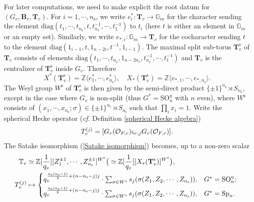 \documentclass[12pt,oneside,reqno]{amsart}
\theoremstyle{plain}
\begin{document}
	For later computations, we need to make explicit the root datum for	$(G_v,\mathbf{B}_v,\mathbf{T}_v)$. For $i=1,\cdots,n_\mathrm{s}$,
	we write $e^\ast_i\colon\mathbf{T}_v\rightarrow\mathbb{G}_m$ for the character sending the element $\mathrm{diag}(t_1,\cdots,t_{n_\mathrm{s}},t,
	t_{n_\mathrm{s}}^{-1},\cdots,t_1^{-1})$ to $t_i$ (here $t$ is either an element in $\mathbb{G}_m$ or an empty set). Similarly, we write $e_{\ast,i}\colon
	\mathbb{G}_m\rightarrow\mathbf{T}_v$ for the cocharacter sending
	$t$ to the element $\mathrm{diag}(1_{i-1},t,1_{n-2i},t^{-1},1_{i-1})$.
	The maximal split sub-torus $\mathbf{T}_v^\mathrm{s}$ of $\mathbf{T}_v$
	consists of elements $\mathrm{diag}(t_1,\cdots,t_{n_\mathrm{s}},1_{n-2n_\mathrm{s}},
	t_{n_\mathrm{s}}^{-1},\cdots,t_1^{-1})$ and $\mathbf{T}_v$ is the centralizer of $\mathbf{T}_v^\mathrm{s}$ inside $G_v$. Therefore
	\[
	X^\ast
	(\mathbf{T}_v^\mathrm{s})
	=
	\mathbb{Z}\langle e_1^\ast,\cdots,e_{n_\mathrm{s}}^\ast\rangle,
	\quad
	X_\ast(\mathbf{T}_v^\mathrm{s})
	=
	\mathbb{Z}
	\langle
	e_{\ast,1},\cdots,e_{\ast,n_\mathrm{s}}\rangle.
	\]
	The Weyl group $W^\mathrm{s}$ of $\mathbf{T}_v^\mathrm{s}$ is then given by the semi-direct product $\{\pm1\}^{n_\mathrm{s}}\rtimes S_{n_\mathrm{s}}$, except in the case where $G_v$ is non-split (thus $G^\ast=\mathrm{SO}_n^\eta$ with $n$ even), where $W^\mathrm{s}$ consists of $(x_1,\cdots,x_{n_\mathrm{s}};\sigma)\in\{\pm1\}^{n_\mathrm{s}}\rtimes S_{n_\mathrm{s}}$ such that $\prod_ix_i=1$. Write the spherical Hecke operator (\emph{cf.} Definition \ref{spherical Hecke algebra})
	\begin{equation}\label{spherical Hecke operators}
		T_v^{(j)}
		=
		[
		G_v(\mathcal{O}_{F,v})
		\varsigma_{v,j}
		G_v(\mathcal{O}_{F,v})
		].\index{T@$T_v^{(j)}$}
	\end{equation}
	The Satake isomorphism
	(\ref{Satake isomorphism})
	becomes,
	up to a non-zero scalar
	\begin{align}\label{Satake isomorphism for quasi-split}
		\begin{split}
			\mathbb{T}_v
			&
			\simeq
			\mathbb{Z}[\frac{1}{q_v}]
			[Z_1^{\pm1},\cdots,Z^{\pm1}_{n_\mathrm{s}}]^{W^\mathrm{s}}
			\big(
			\simeq	  
			\mathbb{Z}[\frac{1}{q_v}]
			[X_\ast(\mathbf{T}_v^\mathrm{s})]^{W^\mathrm{s}}
			\big),  
			\\
			T_v^{(j)}
			&
			\mapsto
			\begin{cases*}
				q_v^{\frac{n_\mathrm{s}(n_\mathrm{s}-1)}{2}+(n-n_\mathrm{s}-j)j}
				\cdot
				\sum_{\sigma\in W^\mathrm{s}}
				s_j(\sigma(Z_1,Z_2,\cdots,Z_{n_\mathrm{s}})),
				&
				$G^\ast=\mathrm{SO}_n^\eta$;
				\\
				q_v^{\frac{n_\mathrm{s}(n_\mathrm{s}+1)}{2}+(n-n_\mathrm{s}-j)j}
				\cdot
				\sum_{\sigma\in W^\mathrm{s}}
				s_j(\sigma(Z_1,Z_2,\cdots,Z_{n_\mathrm{s}})),
				&
				$G^\ast=\mathrm{Sp}_n$.
			\end{cases*}
		\end{split}
	\end{align}
\end{document}
